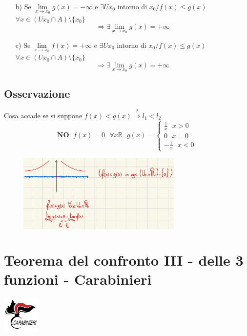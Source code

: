 \documentclass{article}
\newcommand{\R}{\mathbb{R}}
\begin{document}
\begin{flushleft}
\begin{enumerate}
        \item[b)]
        Se $\lim\limits_{x \to x_0} g(x) = - \infty$ e $\exists U x_0$ intorno di $x_0 / f(x) \leq g(x)$ $\forall x \in (U x_0 \cap A) \setminus \{x_0\}$
        \[ \Rightarrow \exists \lim\limits_{x \to x_0} g(x) = + \infty \]

        \item[c)]
        Se $\lim\limits_{x \to x_0} f(x) = + \infty$ e $\exists U x_0$ intorno di $x_0 / f(x) \leq g(x)$ $\forall x \in (U x_0 \cap A) \setminus \{x_0\}$
        \[ \Rightarrow \exists \lim\limits_{x \to x_0} g(x) = + \infty \]
\end{enumerate}
\subsection{Osservazione}
Cosa accade se si suppone $f(x) < g(x) \overset{?}{\Rightarrow} l_1 < l_2$
\[ 
    \textbf{NO: } f(x)=0 \text{ } \forall x \R \text{ } g(x) = 
    \begin{cases}
        \frac{1}{x} \text{ } x > 0\\
        0 \text{ } x = 0\\
        - \frac{1}{x} \text{ } x < 0
    \end{cases}
\]

\begin{figure}[h]
    \centering
    \includegraphics[width=22em]{./images/Teoriaconfronto2.jpeg}
\end{figure}

\newpage
\section{Teorema del confronto III - delle 3 funzioni - Carabinieri}
\includegraphics[width = 5em]{./images/carabinieri.png}

\end{flushleft}
\end{document}
